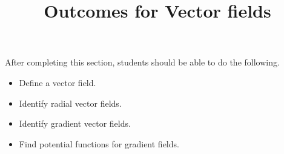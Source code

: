 \documentclass{ximera}
\title{Outcomes for Vector fields}
\begin{document}
\begin{abstract}
\end{abstract}
\maketitle

\begin{sectionOutcomes}

After completing this section, students should be able to do the following.

\begin{itemize}
\item Define a vector field.
\item Identify radial vector fields.
\item Identify gradient vector fields.
\item Find potential functions for gradient fields.
\end{itemize}

\end{sectionOutcomes}
\end{document}
